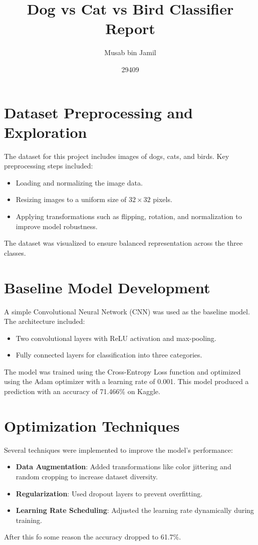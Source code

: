 \documentclass{article}
\title{Dog vs Cat vs Bird Classifier Report}
\author{Musab bin Jamil}
\date{29409}
\begin{document}
\maketitle

\tableofcontents
\newpage

\section{Dataset Preprocessing and Exploration}
The dataset for this project includes images of dogs, cats, and birds. Key preprocessing steps included:
\begin{itemize}
    \item Loading and normalizing the image data.
    \item Resizing images to a uniform size of $32 \times 32$ pixels.
    \item Applying transformations such as flipping, rotation, and normalization to improve model robustness.
\end{itemize}
The dataset was visualized to ensure balanced representation across the three classes.

\section{Baseline Model Development}
A simple Convolutional Neural Network (CNN) was used as the baseline model. The architecture included:
\begin{itemize}
    \item Two convolutional layers with ReLU activation and max-pooling.
    \item Fully connected layers for classification into three categories.
\end{itemize}
The model was trained using the Cross-Entropy Loss function and optimized using the Adam optimizer with a learning rate of 0.001. This model produced a prediction with an accuracy of 71.466\% on Kaggle.

\section{Optimization Techniques}
Several techniques were implemented to improve the model's performance:
\begin{itemize}
    \item \textbf{Data Augmentation}: Added transformations like color jittering and random cropping to increase dataset diversity.
    \item \textbf{Regularization}: Used dropout layers to prevent overfitting.
    \item \textbf{Learning Rate Scheduling}: Adjusted the learning rate dynamically during training.
\end{itemize}
After this fo some reason the accuracy dropped to 61.7\%.
\end{document}
